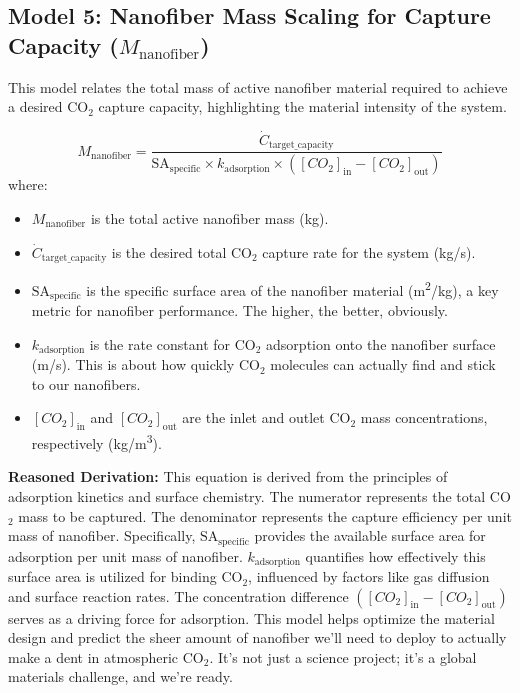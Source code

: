 \documentclass[12pt]{article}
\begin{document}
\subsection*{Model 5: Nanofiber Mass Scaling for Capture Capacity (\(M_{\text{nanofiber}}\))}
This model relates the total mass of active nanofiber material required to achieve a desired CO\(_2\) capture capacity, highlighting the material intensity of the system.

\begin{equation}
M_{\text{nanofiber}} = \frac{\dot{C}_{\text{target\_capacity}}}{\text{SA}_{\text{specific}} \times k_{\text{adsorption}} \times \left( [CO_2]_{\text{in}} - [CO_2]_{\text{out}} \right)}
\label{eq:mass_scaling}
\end{equation}
where:
\begin{itemize}
    \item \(M_{\text{nanofiber}}\) is the total active nanofiber mass (kg).
    \item \(\dot{C}_{\text{target\_capacity}}\) is the desired total CO\(_2\) capture rate for the system (kg/s).
    \item \(\text{SA}_{\text{specific}}\) is the specific surface area of the nanofiber material (m\textsuperscript{2}/kg), a key metric for nanofiber performance. The higher, the better, obviously.
    \item \(k_{\text{adsorption}}\) is the rate constant for CO\(_2\) adsorption onto the nanofiber surface (m/s). This is about how quickly CO\(_2\) molecules can actually find and stick to our nanofibers.
    \item \([CO_2]_{\text{in}}\) and \([CO_2]_{\text{out}}\) are the inlet and outlet CO\(_2\) mass concentrations, respectively (kg/m\textsuperscript{3}).
\end{itemize}

\textbf{Reasoned Derivation:} This equation is derived from the principles of adsorption kinetics and surface chemistry. The numerator represents the total CO\(_2\) mass to be captured. The denominator represents the capture efficiency per unit mass of nanofiber. Specifically, \(\text{SA}_{\text{specific}}\) provides the available surface area for adsorption per unit mass of nanofiber. \(k_{\text{adsorption}}\) quantifies how effectively this surface area is utilized for binding CO\(_2\), influenced by factors like gas diffusion and surface reaction rates. The concentration difference \(([CO_2]_{\text{in}} - [CO_2]_{\text{out}})\) serves as a driving force for adsorption. This model helps optimize the material design and predict the sheer amount of nanofiber we'll need to deploy to actually make a dent in atmospheric CO\(_2\). It’s not just a science project; it's a global materials challenge, and we're ready.
\end{document}
